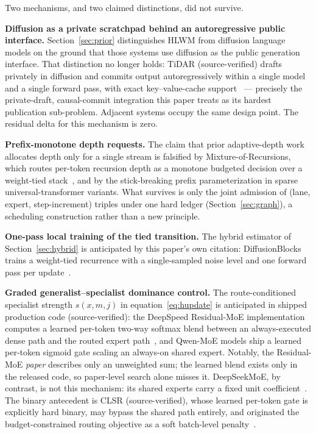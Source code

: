 \documentclass[10pt,a4paper]{article}
\begin{document}
Two mechanisms, and two claimed distinctions, did not survive.

\textbf{Diffusion as a private scratchpad behind an autoregressive public
interface.} Section~\ref{sec:prior} distinguishes HLWM from diffusion
language models on the ground that those systems use diffusion as the public
generation interface. That distinction no longer holds: TiDAR
(source-verified) drafts privately in diffusion and commits output
autoregressively within a single model and a single forward pass, with exact
key--value-cache support~\cite{tidar2025} --- precisely the private-draft,
causal-commit integration this paper treats as its hardest publication
sub-problem. Adjacent systems occupy the same design point. The residual
delta for this mechanism is zero.

\textbf{Prefix-monotone depth requests.} The claim that prior adaptive-depth
work allocates depth only for a single stream is falsified by
Mixture-of-Recursions, which routes per-token recursion depth as a monotone
budgeted decision over a weight-tied stack~\cite{mor2025}, and by the
stick-breaking prefix parameterization in sparse universal-transformer
variants. What survives is only the joint admission of (lane, expert,
step-increment) triples under one hard ledger (Section~\ref{sec:graph}), a
scheduling construction rather than a new principle.

\textbf{One-pass local training of the tied transition.} The hybrid estimator
of Section~\ref{sec:hybrid} is anticipated by this paper's own citation:
DiffusionBlocks trains a weight-tied recurrence with a single-sampled noise
level and one forward pass per update~\cite{shing2025}.

\textbf{Graded generalist--specialist dominance control.} The
route-conditioned specialist strength $s(x,m,j)$ in
equation~\eqref{eq:hupdate} is anticipated in shipped production code
(source-verified): the DeepSpeed Residual-MoE implementation computes a
learned per-token two-way softmax blend between an always-executed dense path
and the routed expert path~\cite{rajbhandari2022}, and Qwen-MoE models ship a
learned per-token sigmoid gate scaling an always-on shared expert. Notably,
the Residual-MoE \emph{paper} describes only an unweighted sum; the learned
blend exists only in the released code, so paper-level search alone misses
it. DeepSeekMoE, by contrast, is not this mechanism: its shared experts carry
a fixed unit coefficient~\cite{dai2024}. The binary antecedent is CLSR
(source-verified), whose learned per-token gate is explicitly hard binary,
may bypass the shared path entirely, and originated the budget-constrained
routing objective as a soft batch-level penalty~\cite{zhang2021clsr}.
\end{document}

